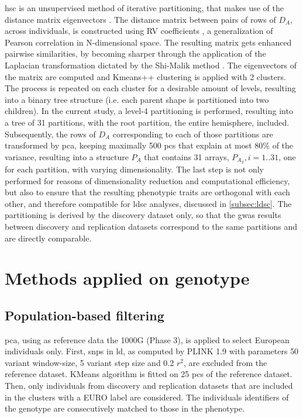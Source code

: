 \Ac{hsc} is an unsupervised method of iterative partitioning, that makes use of the distance matrix eigenvectors \cite{Ng2002}. The distance matrix between pairs of rows of $D_A$, across individuals, is constructed using RV coefficients \cite{Robert1976}, a generalization of Pearson correlation in N-dimensional space. The resulting matrix gets enhanced pairwise similarities, by becoming sharper through the application of the Laplacian transformation dictated by the Shi-Malik method \cite{Shi2000}. The eigenvectors of the matrix are computed and Kmeans++ clustering \cite{Arthur2007} is applied with 2 clusters. The process is repeated on each cluster for a desirable amount of levels, resulting into a binary tree structure (i.e. each parent shape is partitioned into two children). In the current study, a level-4 partitioning is performed, resulting into a tree of 31 partitions, with the root partition, the entire hemisphere, included. Subsequently, the rows of $D_A$ corresponding to each of those partitions are transformed by \ac{pca}, keeping maximally 500 \acp{pc} that explain at most 80\% of the variance, resulting into a structure $P_A$ that contains 31 arrays, ${P_A}_i,i=1..31$, one for each partition, with varying dimensionality. The last step is not only performed for reasons of dimensionality reduction and computational efficiency, but also to ensure that the resulting phenotypic traits are orthogonal with each other, and therefore compatible for \ac{ldsc} analyses, discussed in \autoref{subsec:ldsc}. The partitioning is derived by the discovery dataset only, so that the \ac{gwas} results between discovery and replication datasets correspond to the same partitions and are directly comparable.

\section{Methods applied on genotype}
\subsection{Population-based filtering}
\ac{pca}, using as reference data the 1000G (Phase 3), is applied to select European individuals only. First, \acp{snp} in \ac{ld}, as computed by PLINK 1.9 with parameters 50 variant window-size, 5 variant step size and 0.2 $r^2$, are excluded from the reference dataset. KMeans algorithm is fitted on 25 \acp{pc} of the reference dataset. Then, only individuals from discovery and replication datasets that are included in the clusters with a EURO label are considered. The individuals identifiers of the genotype are consecutively matched to those in the phenotype.

